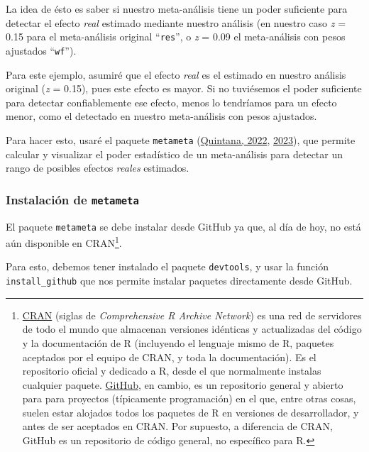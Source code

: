 \documentclass[
  bookmarksnumbered]{article}
\begin{document}
La idea de ésto es saber si nuestro meta-análisis tiene un poder suficiente para detectar el efecto \emph{real} estimado mediante nuestro análisis (en nuestro caso \emph{z} = 0.15 para el meta-análisis original ``\texttt{res}'', o \emph{z} = 0.09 el meta-análisis con pesos ajustados ``\texttt{wf}'').

Para este ejemplo, asumiré que el efecto \emph{real} es el estimado en nuestro análisis original (\emph{z} = 0.15), pues este efecto es mayor. Si no tuviésemos el poder suficiente para detectar confiablemente ese efecto, menos lo tendríamos para un efecto menor, como el detectado en nuestro meta-análisis con pesos ajustados.

Para hacer esto, usaré el paquete \texttt{metameta} (\protect\hyperlink{ref-quintanaMetameta2022}{Quintana, 2022}, \protect\hyperlink{ref-quintanaGuideMetaPower}{2023}), que permite calcular y visualizar el poder estadístico de un meta-análisis para detectar un rango de posibles efectos \emph{reales} estimados.

\hypertarget{instalaciuxf3n-de-metameta}{%
\subsubsection{\texorpdfstring{Instalación de \texttt{metameta}}{Instalación de metameta}}\label{instalaciuxf3n-de-metameta}}

El paquete \texttt{metameta} se debe instalar desde GitHub ya que, al día de hoy, no está aún disponible en CRAN\footnote{\href{https://cran.r-project.org/}{CRAN} (siglas de \emph{Comprehensive R Archive Network}) es una red de servidores de todo el mundo que almacenan versiones idénticas y actualizadas del código y la documentación de R (incluyendo el lenguaje mismo de R, paquetes aceptados por el equipo de CRAN, y toda la documentación). Es el repositorio oficial y dedicado a R, desde el que normalmente instalas cualquier paquete. \href{https://github.com/}{GitHub}, en cambio, es un repositorio general y abierto para para proyectos (típicamente programación) en el que, entre otras cosas, suelen estar alojados todos los paquetes de R en versiones de desarrollador, y antes de ser aceptados en CRAN. Por supuesto, a diferencia de CRAN, GitHub es un repositorio de código general, no específico para R.}.

Para esto, debemos tener instalado el paquete \texttt{devtools}, y usar la función \texttt{install\_github} que nos permite instalar paquetes directamente desde GitHub.
\end{document}
